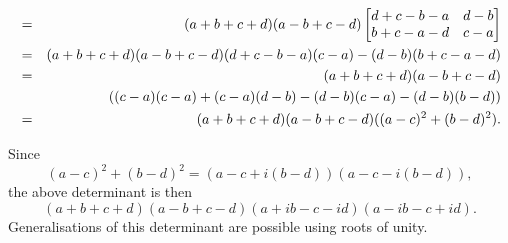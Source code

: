 \begin{pro}
\begin{answer}
\begin{eqnarray*}
& = & (a+b+c+d)(a-b+c-d)\begin{bmatrix}  d+c-b-a & d-b \cr b+c-a-d &
c-a
 \cr
\end{bmatrix}\\
& = & (a+b+c+d)(a-b+c-d) (d+c-b-a)(c-a)-(d-b)(b+c-a-d)
\\
& = & (a+b+c+d)(a-b+c-d)\\
& & \qquad
((c-a)(c-a)+(c-a)(d-b)-(d-b)(c-a)-(d-b)(b-d))
\\
& = & (a+b+c+d)(a-b+c-d)((a-c)^2+(b-d)^2).
\end{eqnarray*}
\begin{rem}
Since $$ (a-c)^2+(b-d)^2=(a-c+i(b-d))(a-c-i(b-d)), $$ the
above determinant is then
$$ (a+b+c+d)(a-b+c-d)(a+ib-c-id)(a-ib-c+id). $$
Generalisations of this determinant are possible using roots of
unity.
\end{rem}
\end{answer}
\end{pro}


